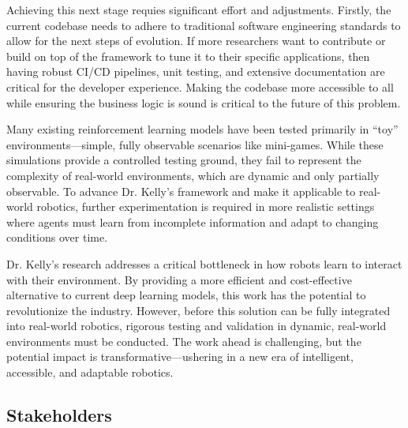\documentclass{article}
\begin{document}
Achieving this next stage requies significant effort and adjustments. Firstly, the current codebase needs to adhere to traditional software engineering standards to allow for the next steps of evolution. If more researchers want to contribute or build on top of the framework to tune it to their specific applications, then having robust CI/CD pipelines, unit testing, and extensive documentation are critical for the developer experience. Making the codebase more accessible to all while ensuring the business logic is sound is critical to the future of this problem. 

Many existing reinforcement learning models have been tested primarily in “toy” environments—simple, fully observable scenarios like mini-games. While these simulations provide a controlled testing ground, they fail to represent the complexity of real-world environments, which are dynamic and only partially observable. To advance Dr. Kelly’s framework and make it applicable to real-world robotics, further experimentation is required in more realistic settings where agents must learn from incomplete information and adapt to changing conditions over time.

Dr. Kelly’s research addresses a critical bottleneck in how robots learn to interact with their environment. By providing a more efficient and cost-effective alternative to current deep learning models, this work has the potential to revolutionize the industry. However, before this solution can be fully integrated into real-world robotics, rigorous testing and validation in dynamic, real-world environments must be conducted. The work ahead is challenging, but the potential impact is transformative—ushering in a new era of intelligent, accessible, and adaptable robotics.

\subsection{Stakeholders}
\end{document}
